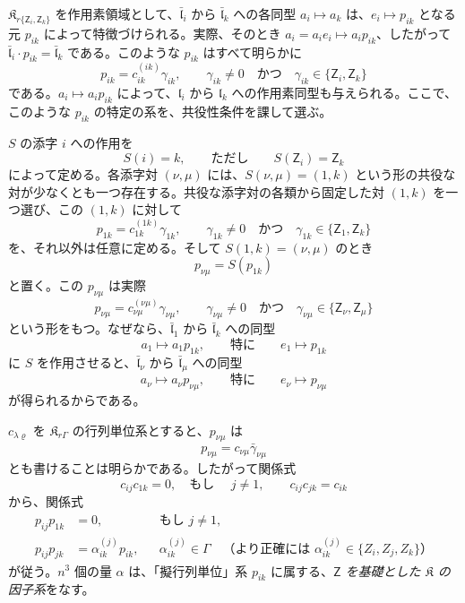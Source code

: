 \(\mathfrak K_{r\{\mathsf{Z}_i,\mathsf{Z}_k\}}\) を作用素領域として、\(\bar{\mathfrak l}_i\) から \(\bar{\mathfrak l}_k\) への各同型 \(a_i\mapsto a_k\) は、\(e_i\mapsto p_{ik}\) となる元 \(p_{ik}\) によって特徴づけられる。実際、そのとき \(a_i=a_ie_i\mapsto a_ip_{ik}\)、したがって \(\bar{\mathfrak l}_i\cdot p_{ik}=\bar{\mathfrak l}_k\) である。このような \(p_{ik}\) はすべて明らかに
\[
p_{ik}=c_{ik}^{(ik)}\gamma_{ik},\qquad
\gamma_{ik}\ne0\quad\text{かつ}\quad \gamma_{ik}\in\{\mathsf{Z}_i,\mathsf{Z}_k\}
\]
である。\(a_i\mapsto a_ip_{ik}\) によって、\(\mathfrak l_i\) から \(\mathfrak l_k\) への作用素同型も与えられる。ここで、このような \(p_{ik}\) の特定の系を、共役性条件を課して選ぶ。

\(S\) の添字 \(i\) への作用を
\[
S(i)=k,\qquad\text{ただし}\qquad S(\mathsf{Z}_i)=\mathsf{Z}_k
\]
によって定める。各添字対 \((\nu,\mu)\) には、\(S(\nu,\mu)=(1,k)\) という形の共役な対が少なくとも一つ存在する。共役な添字対の各類から固定した対 \((1,k)\) を一つ選び、この \((1,k)\) に対して
\[
p_{1k}=c_{1k}^{(1k)}\gamma_{1k},\qquad
\gamma_{1k}\ne0\quad\text{かつ}\quad \gamma_{1k}\in\{\mathsf{Z}_1,\mathsf{Z}_k\}
\]
を、それ以外は任意に定める。そして \(S(1,k)=(\nu,\mu)\) のとき
\[
p_{\nu\mu}=S(p_{1k})
\]
と置く。この \(p_{\nu\mu}\) は実際
\[
p_{\nu\mu}=c_{\nu\mu}^{(\nu\mu)}\gamma_{\nu\mu},\qquad
\gamma_{\nu\mu}\ne0\quad\text{かつ}\quad \gamma_{\nu\mu}\in\{\mathsf{Z}_\nu,\mathsf{Z}_\mu\}
\]
という形をもつ。なぜなら、\(\bar{\mathfrak l}_1\) から \(\bar{\mathfrak l}_k\) への同型
\[
a_1\mapsto a_1p_{1k},\qquad
\text{特に}\qquad e_1\mapsto p_{1k}
\]
に \(S\) を作用させると、\(\bar{\mathfrak l}_\nu\) から \(\bar{\mathfrak l}_\mu\) への同型
\[
a_\nu\mapsto a_\nu p_{\nu\mu},\qquad
\text{特に}\qquad e_\nu\mapsto p_{\nu\mu}
\]
が得られるからである。

\(c_{\lambda\varrho}\) を \(\mathfrak K_{r\Gamma}\) の行列単位系とすると、\(p_{\nu\mu}\) は
\[
p_{\nu\mu}=c_{\nu\mu}\bar\gamma_{\nu\mu}
\]
とも書けることは明らかである。したがって関係式
\[
c_{ij}c_{1k}=0,\quad\text{もし }\quad j\ne1,
\qquad
c_{ij}c_{jk}=c_{ik}
\]
から、関係式
\[
\begin{aligned}
p_{ij}p_{1k}&=0,\quad &&\text{もし }j\ne1,\\
p_{ij}p_{jk}&=\alpha_{ik}^{(j)}p_{ik},
&&\alpha_{ik}^{(j)}\in\Gamma
\quad\text{（より正確には }\alpha_{ik}^{(j)}\in\{Z_i,Z_j,Z_k\}\text{）}
\end{aligned}
\]
が従う。\(n^3\) 個の量 \(\alpha\) は、「擬行列単位」系 \(p_{ik}\) に属する、\emph{\(\mathsf{Z}\) を基礎とした \(\mathfrak K\) の因子系}をなす。

